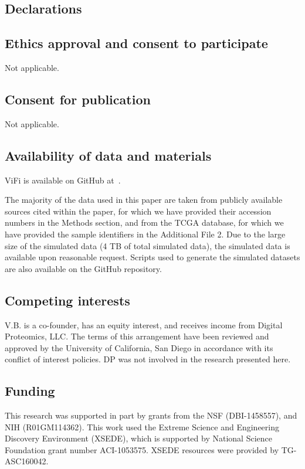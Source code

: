 \documentclass{bmcart}
\begin{document}

\begin{backmatter}
\section*{Declarations}
\subsection*{Ethics approval and consent to participate}
Not applicable.
\subsection*{Consent for publication}
Not applicable.

\subsection*{Availability of data and materials}
ViFi is available on GitHub at~\cite{Nguyen_github}.  

The majority of the data used in this paper are taken from publicly available sources cited within the paper, for which we have provided their accession numbers in the Methods section, and from the TCGA database, for which we have provided the sample identifiers in the Additional File 2.  Due to the large size of the simulated data (4 TB of total simulated data), the simulated data is available upon reasonable request.  Scripts used to generate the simulated datasets are also available on the GitHub repository.

\subsection*{Competing interests}
V.B. is a co-founder, has an equity interest, and receives income from Digital Proteomics, LLC. The terms of this arrangement have been reviewed and approved by the University of California, San Diego in accordance with its conflict of interest policies. DP was not involved in the research presented here.

\subsection*{Funding}
This research was supported in part by grants from the NSF (DBI-1458557), and NIH (R01GM114362).  This work used the Extreme Science and Engineering Discovery Environment (XSEDE), which is supported by National Science Foundation grant number ACI-1053575.  XSEDE resources were provided by TG-ASC160042.  



\end{backmatter}
\end{document}
